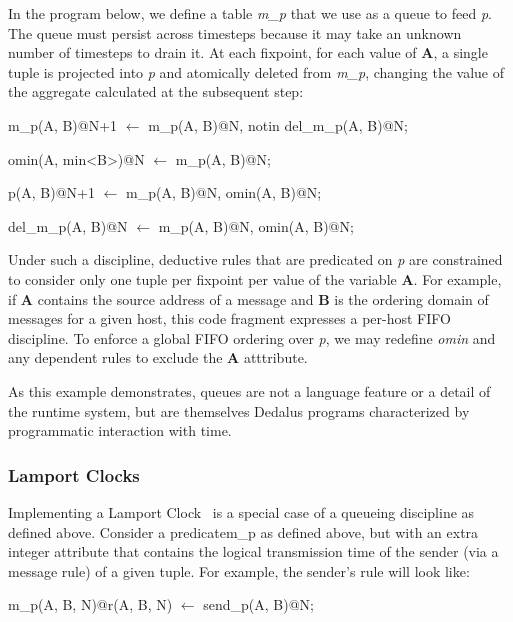 In the program below, we define a table \emph{m\_p} that we use as a queue to feed \emph{p}.  The queue must persist across
timesteps because it may take an unknown number of timesteps to drain it.  At each fixpoint, for each value of \textbf{A}, a single
tuple is projected into \emph{p} and atomically deleted from \emph{m\_p}, changing the value of the aggregate calculated at the
subsequent step:


\begin{Dedalus}
m\_p(A, B)@N+1 \(\leftarrow\)
  m\_p(A, B)@N,
  notin del\_m\_p(A, B)@N;

omin(A, min<B>)@N \(\leftarrow\)
  m\_p(A, B)@N;

p(A, B)@N+1 \(\leftarrow\)
  m\_p(A, B)@N,
  omin(A, B)@N;

del\_m\_p(A, B)@N \(\leftarrow\)
  m\_p(A, B)@N,
  omin(A, B)@N;
\end{Dedalus}

Under such a discipline, deductive rules that are predicated on \emph{p} are constrained to consider only one tuple per fixpoint
per value of the variable \textbf{A}.  For example, if \textbf{A} contains the source address of a message and \textbf{B} is the ordering
domain of messages for a given host, this code fragment
expresses a per-host FIFO discipline.  To enforce a global FIFO ordering over \emph{p}, we may redefine \emph{omin} and any 
dependent rules to exclude the \textbf{A} atttribute.

As this example demonstrates, queues are not a language feature or a detail of the runtime system, but are themselves Dedalus programs
characterized by programmatic interaction with time.



\subsubsection{Lamport Clocks}

Implementing a Lamport Clock~\cite{timeclocks} is a special case of a queueing discipline as defined above.
Consider a predicate{m\_p} as defined above, but with an extra integer attribute that contains the logical transmission
time of the sender (via a message rule) of a given tuple.  For example, the sender's rule will look like: 

\begin{Dedalus}
m\_p(A, B, N)@r(A, B, N) \(\leftarrow\)
  send\_p(A, B)@N;
\end{Dedalus}

